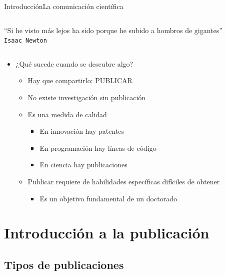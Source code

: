 \documentclass{beamer}
\begin{document}
\begin{frame}{Introducción}{La comunicación científica}
	\vspace{-0.3cm}
	\begin{center}
	\begin{columns}
	\begin{block}{}
	\begin{center}
	``Si he visto más lejos ha sido porque he subido a hombros de gigantes''\\
    \texttt{Isaac Newton}
	\end{center}
	\end{block}
	\end{columns}
	\end{center}
    \begin{itemize}
	\item ¿Qué sucede cuando se descubre algo?
	    \begin{itemize}
			\item Hay que compartirlo: \alert{PUBLICAR}
			\item No existe investigación sin publicación
			\item Es una medida de calidad
				\begin{itemize}
					\item En innovación hay patentes
					\item En programación hay líneas de código
					\item En ciencia hay publicaciones
				\end{itemize}
			\item Publicar requiere de habilidades específicas difíciles de obtener
				\begin{itemize}
					\item Es un objetivo fundamental de un doctorado
				\end{itemize}
	    \end{itemize}
    \end{itemize}
\end{frame}

\section{Introducción a la publicación}

\subsection{Tipos de publicaciones}
\end{document}
